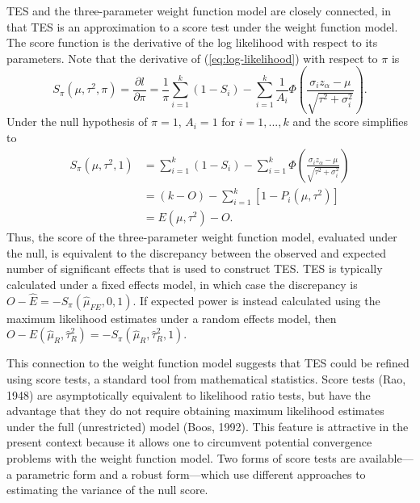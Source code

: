 \documentclass[man,floatsintext]{apa6}
\begin{document}
TES and the three-parameter weight function model are closely connected, in that TES is an approximation to a score test under the weight function model.
The score function is the derivative of the log likelihood with respect to its parameters.
Note that the derivative of (\ref{eq:log-likelihood}) with respect to \(\pi\) is
\begin{equation}
S_\pi(\mu, \tau^2, \pi) = \frac{\partial l}{\partial \pi} = \frac{1}{\pi} \sum_{i=1}^k (1 - S_i) - \sum_{i=1}^k \frac{1}{A_i} \Phi\left( \frac{\sigma_i z_\alpha - \mu}{\sqrt{\tau^2 + \sigma_i^2}}\right).
\label{eq:score-pi}
\end{equation}
Under the null hypothesis of \(\pi = 1\), \(A_i = 1\) for \(i = 1,...,k\) and the score simplifies to
\[
\begin{aligned}
S_\pi(\mu, \tau^2, 1) &= \sum_{i=1}^k (1 - S_i) - \sum_{i=1}^k \Phi\left( \frac{\sigma_i z_\alpha - \mu}{\sqrt{\tau^2 + \sigma_i^2}}\right) \\
&= (k - O) - \sum_{i=1}^k \left[1 - P_i(\mu, \tau^2)\right] \\
&= E(\mu,\tau^2) - O.
\end{aligned}
\]
Thus, the score of the three-parameter weight function model, evaluated under the null, is equivalent to the discrepancy between the observed and expected number of significant effects that is used to construct TES.
TES is typically calculated under a fixed effects model, in which case the discrepancy is \(O - \hat{E} = - S_\pi(\hat\mu_{FE}, 0, 1)\). If expected power is instead calculated using the maximum likelihood estimates under a random effects model, then \(O - E(\hat\mu_R, \hat\tau^2_R) = - S_\pi(\hat\mu_R, \hat\tau^2_R, 1)\).

This connection to the weight function model suggests that TES could be refined using score tests, a standard tool from mathematical statistics. Score tests (Rao, 1948) are asymptotically equivalent to likelihood ratio tests, but have the advantage that they do not require obtaining maximum likelihood estimates under the full (unrestricted) model (Boos, 1992). This feature is attractive in the present context because it allows one to circumvent potential convergence problems with the weight function model. Two forms of score tests are available---a parametric form and a robust form---which use different approaches to estimating the variance of the null score.
\end{document}
